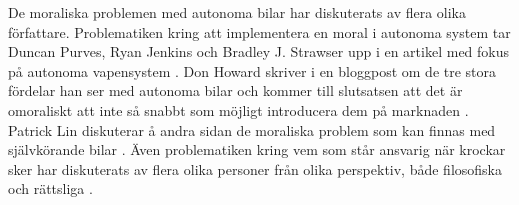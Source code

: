De moraliska problemen med autonoma bilar har diskuterats av flera olika författare. Problematiken kring att implementera en moral i autonoma system tar Duncan Purves, Ryan Jenkins och Bradley J. Strawser upp i en artikel med fokus på autonoma vapensystem \cite{aws}. Don Howard skriver i en bloggpost om de tre stora fördelar han ser med autonoma bilar och kommer till slutsatsen att det är omoraliskt att inte så snabbt som möjligt introducera dem på marknaden \cite{howard}. Patrick Lin diskuterar å andra sidan de moraliska problem som kan finnas med självkörande bilar \cite{patricklin}. Även problematiken kring vem som står ansvarig när krockar sker har diskuterats av flera olika personer från olika perspektiv, både filosofiska \cite{goodall2014ethical, machineethics, autonomouscrashes} och rättsliga \cite{liability}.